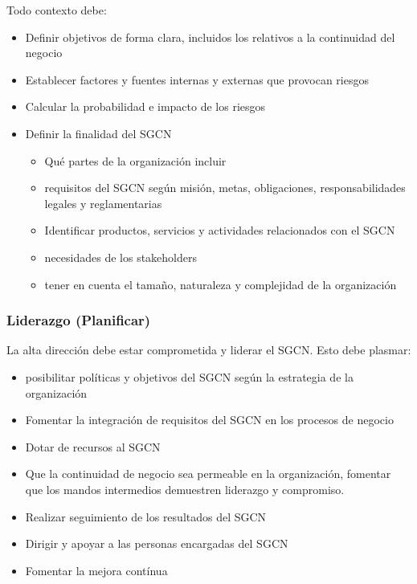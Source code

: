         Todo contexto debe:
        \begin{itemize}
            \item Definir objetivos de forma clara, incluidos los relativos a la continuidad del negocio
            \item Establecer factores y fuentes internas y externas que provocan riesgos
            \item Calcular la probabilidad e impacto de los riesgos
            \item Definir la finalidad del SGCN \begin{itemize}
                \item Qué partes de la organización incluir
                \item requisitos del SGCN según misión, metas, obligaciones, responsabilidades legales y reglamentarias
                \item Identificar productos, servicios y actividades relacionados con el SGCN
                \item necesidades de los stakeholders
                \item tener en cuenta el tamaño, naturaleza y complejidad de la organización
            \end{itemize}
        \end{itemize}

    \subsubsection{Liderazgo (Planificar)} %
        La alta dirección debe estar comprometida y liderar el SGCN. Esto debe plasmar:
        \begin{itemize}
            \item posibilitar políticas y objetivos del SGCN según la estrategia de la organización
            \item Fomentar la integración de requisitos del SGCN en los procesos de negocio
            \item Dotar de recursos al SGCN
            \item Que la continuidad de negocio sea permeable en la organización, fomentar que los mandos intermedios demuestren liderazgo y compromiso.
            \item Realizar seguimiento de los resultados del SGCN
            \item Dirigir y apoyar a las personas encargadas del SGCN
            \item Fomentar la mejora contínua
        \end{itemize}

